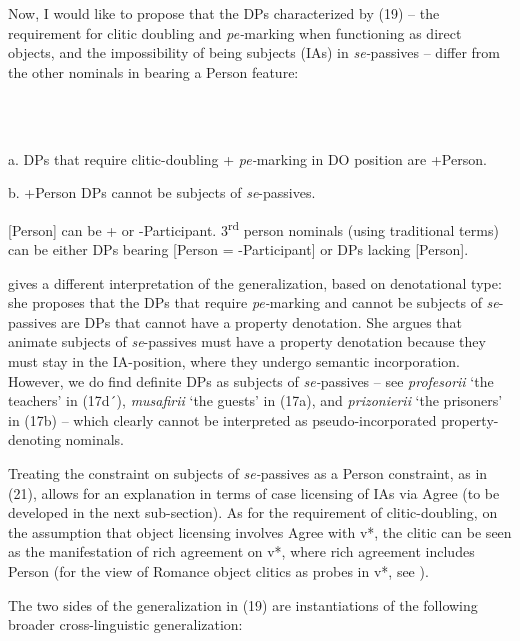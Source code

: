 \documentclass[output=paper]{langsci/langscibook}
\begin{document}
  Now, I would like to propose that the DPs characterized by (19) – the requirement for clitic doubling and \textit{pe-}marking when functioning as direct objects, and the impossibility of being subjects (IAs) in \textit{se-}passives – differ from the other nominals in bearing a Person feature:

\ea%
    \label{ex:key:21}
    \gll\\
        \\
    \glt
    \z

          a.   DPs that require clitic-doubling + \textit{pe-}marking in DO position are +Person.

b.   +Person DPs cannot be subjects of \textit{se}{}-passives.

[Person] can be + or -Participant. 3\textsuperscript{rd} person nominals (using traditional terms) can be either DPs bearing [Person = -Participant] or DPs lacking [Person].

  \citet{Cornilescu1998} gives a different interpretation of the generalization, based on denotational type: she proposes that the DPs that require \textit{pe-}marking and cannot be subjects of \textit{se}{}-passives are DPs that cannot have a property denotation. She argues that animate subjects of \textit{se}{}-passives must have a property denotation because they must stay in the IA-position, where they undergo semantic incorporation. However, we do find definite DPs as subjects of \textit{se-}passives – see \textit{profesorii} ‘the teachers’ in (17d´), \textit{musafirii} ‘the guests’ in (17a), and \textit{prizonierii} ‘the prisoners’ in (17b) – which clearly cannot be interpreted as pseudo-incorporated property-denoting nominals.

  Treating the constraint on subjects of \textit{se-}passives as a Person constraint, as in (21), allows for an explanation in terms of case licensing of IAs via Agree (to be developed in the next sub-section). As for the requirement of clitic-doubling, on the assumption that object licensing involves Agree with v*, the clitic can be seen as the manifestation of rich agreement on v*, where rich agreement includes Person (for the view of Romance object clitics as probes in v*, see \citealt{Roberts2010}).

The two sides of the generalization in (19) are instantiations of the following broader cross-linguistic generalization:

\ea%
    \label{ex:key:22}
    \gll\\
        \\
    \glt
    \z
\end{document}
